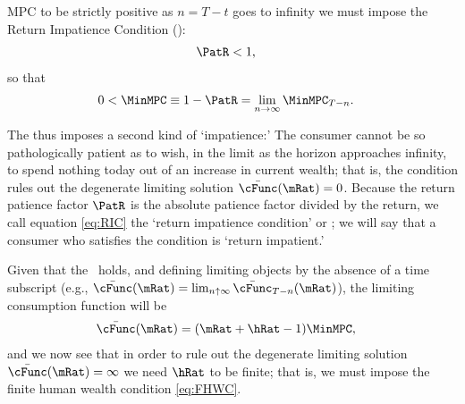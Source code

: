 \documentclass[BufferStockTheory]{subfiles}
\begin{document}
MPC to be strictly positive as $n=T-t$ goes to infinity we must impose the Return Impatience Condition (\RIC):
\begin{equation}\begin{gathered}\begin{aligned}
  \PatR  & < 1   \label{eq:RIC},
\end{aligned}\end{gathered}\end{equation}
so that
\begin{equation}\begin{gathered}\begin{aligned}
  0 <  \MinMPC  & \equiv   1-\PatR = \lim_{n \rightarrow \infty} \MinMPC_{T-n} \label{eq:MinMPCDef}
                  .
\end{aligned}\end{gathered}\end{equation}


The {\RIC} thus imposes a second kind of `impatience:' The consumer cannot be so pathologically patient as to wish, in the limit as the horizon approaches infinity, to spend nothing today out of an increase in current wealth; that is, the condition rules out the degenerate limiting solution $\bar{\cFunc}(\mRat)=0$.  Because the return patience factor $\PatR$ is the absolute patience factor divided by the return, we call equation \eqref{eq:RIC} the `return impatience condition' or \RIC; we will say that a consumer who satisfies the condition is `return impatient.'

Given that the \RIC~holds, and defining limiting objects by the absence of a time subscript (e.g., $\bar{\cFunc}(\mRat)=\lim_{n \uparrow \infty} \bar{\cFunc}_{T-n}(\mRat)$), the limiting consumption function will be
\begin{equation}\begin{gathered}\begin{aligned}\label{eq:cFuncPFUnc}
  \bar{\cFunc}(\mRat)  & = (\mRat+\hRat-1)\MinMPC, 
\end{aligned}\end{gathered}\end{equation}
and we now see that in order to rule out the degenerate limiting
solution $\bar{\cFunc}(\mRat) = \infty$ we need $\hRat$ to be finite; that is, we
must impose the finite human wealth condition \eqref{eq:FHWC}.
\end{document}
